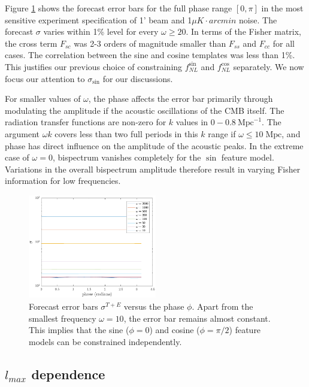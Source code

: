 Figure \ref{forecast_phase_dependence} shows the forecast error bars for the full phase range $[0,\pi]$ in the most sensitive experiment specification of 1' beam and 1$\mu K \cdot arcmin$ noise. The forecast $\sigma$ varies within 1\% level for every $\omega\ge20$. In terms of the Fisher matrix, the cross term $F_{sc}$ was 2-3 orders of magnitude smaller than $F_{ss}$ and $F_{cc}$ for all cases. The correlation between the sine and cosine templates was less than 1\%. This justifies our previous choice of constraining $f_{NL}^{\sin}$ and $f_{NL}^{\cos}$ separately. We now focus our attention to $\sigma_{\sin}$ for our discussions.

For smaller values of $\omega$, the phase affects the error bar primarily through modulating the amplitude if the acoustic oscillations of the CMB itself. The radiation transfer functions are non-zero for $k$ values in $0 - 0.8 ~\text{Mpc}^{-1}$. The argument $\omega k$ covers less than two full periods in this $k$ range if $\omega \le 10\; \text{Mpc}$, and phase has direct influence on the amplitude of the acoustic peaks. In the extreme case of $\omega=0$, bispectrum vanishes completely for the $\sin$ feature model. Variations in the overall bispectrum amplitude therefore result in varying Fisher information for low frequencies.

\begin{figure}[ht]
	\centering
	\includegraphics[width=0.5\textwidth]{phase_2D.pdf}
	\caption{Forecast error bars $\sigma^{T+E}$ versus the phase $\phi$. Apart from the smallest frequency $\omega=10$, the error bar remains almost constant. This implies that the sine ($\phi=0$) and cosine ($\phi=\pi/2$) feature models can be constrained independently.}
	\label{forecast_phase_dependence}
\end{figure}

\subsection{$l_{max}$ dependence}


